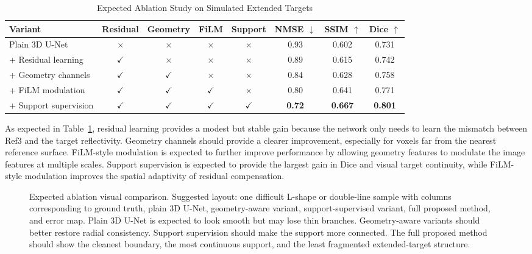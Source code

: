 \documentclass[journal]{IEEEtran}
\begin{document}
\begin{table}[t]
\caption{Expected Ablation Study on Simulated Extended Targets}
\label{tab:ablation}
\centering
\begin{tabular}{lccccccc}
\hline
Variant & Residual & Geometry & FiLM & Support & NMSE $\downarrow$ & SSIM $\uparrow$ & Dice $\uparrow$ \\
\hline
Plain 3D U-Net & $\times$ & $\times$ & $\times$ & $\times$ & 0.93 & 0.602 & 0.731 \\
+ Residual learning & $\checkmark$ & $\times$ & $\times$ & $\times$ & 0.89 & 0.615 & 0.742 \\
+ Geometry channels & $\checkmark$ & $\checkmark$ & $\times$ & $\times$ & 0.84 & 0.628 & 0.758 \\
+ FiLM modulation & $\checkmark$ & $\checkmark$ & $\checkmark$ & $\times$ & 0.80 & 0.641 & 0.771 \\
+ Support supervision & $\checkmark$ & $\checkmark$ & $\checkmark$ & $\checkmark$ & \textbf{0.72} & \textbf{0.667} & \textbf{0.801} \\
\hline
\end{tabular}
\end{table}

As expected in Table~\ref{tab:ablation}, residual learning provides a modest but stable gain because the network only needs to learn the mismatch between Ref3 and the target reflectivity. Geometry channels should provide a clearer improvement, especially for voxels far from the nearest reference surface. FiLM-style modulation is expected to further improve performance by allowing geometry features to modulate the image features at multiple scales. Support supervision is expected to provide the largest gain in Dice and visual target continuity, while FiLM-style modulation improves the spatial adaptivity of residual compensation.

\begin{figure}[t]
\centering
{}
\caption{Expected ablation visual comparison. Suggested layout: one difficult L-shape or double-line sample with columns corresponding to ground truth, plain 3D U-Net, geometry-aware variant, support-supervised variant, full proposed method, and error map. Plain 3D U-Net is expected to look smooth but may lose thin branches. Geometry-aware variants should better restore radial consistency. Support supervision should make the support more connected. The full proposed method should show the cleanest boundary, the most continuous support, and the least fragmented extended-target structure.}
\label{fig:ablation_visual}
\end{figure}
\end{document}

